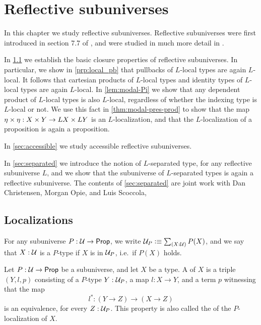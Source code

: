 \chapter{Reflective subuniverses}

In this chapter we study reflective subuniverses. Reflective subuniverses were first introduced in section 7.7 of \cite{hottbook}, and were studied in much more detail in \cite{RijkeShulmanSpitters}. 

In \cref{sec:prop-rfsu} we establish the basic closure properties of reflective subuniverses. In particular, we show in \cref{prp:local_pb} that pullbacks of $L$-local types are again $L$-local. It follows that cartesian products of $L$-local types and identity types of $L$-local types are again $L$-local. In \cref{lem:modal-Pi} we show that any dependent product of $L$-local types is also $L$-local, regardless of whether the indexing type is $L$-local or not. We use this fact in \cref{thm:modal-pres-prod} to show that the map ${\eta_{}}\times{\eta_{}}:X\times Y\to LX\times LY$ is an $L$-localization, and that the $L$-localization of a proposition is again a proposition.

In \cref{sec:accessible} we study accessible reflective subuniverses.

In \cref{sec:separated} we introduce the notion of $L$-separated type, for any reflective subuniverse $L$, and we show that the subuniverse of $L$-separated types is again a reflective subuniverse. The contents of \cref{sec:separated} are joint work with Dan Christensen, Morgan Opie, and Luis Scoccola, 

\section{Localizations}
\label{sec:prop-rfsu}

For any subuniverse $P:\mathcal{U}\to\mathsf{Prop}$, we write $\UU_P\defeq \sm{X:\UU}P(X)$, and we say that $X:\mathcal{U}$ is a $P$-type if $X$ is in $\mathcal{U}_P$, i.e.~if $P(X)$ holds.

\begin{defn}
Let $P:\mathcal{U}\to\mathsf{Prop}$ be a subuniverse, and let $X$ be a type. A  of $X$ is a triple $(Y,l,p)$ consisting of a $P$-type $Y:\mathcal{U}_P$, a map $l:X\to Y$, and a term $p$ witnessing that the map
\begin{equation*}
l^\ast : (Y\to Z)\to (X\to Z)
\end{equation*}
is an equivalence, for every $Z:\mathcal{U}_P$. This property is also called the  of the $P$-localization of $X$.
\end{defn}

